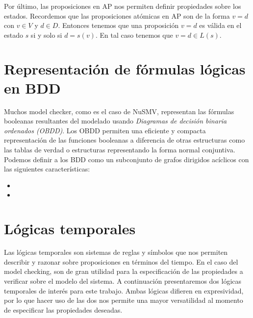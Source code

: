 \documentclass[titlepage, 12pt]{book}
\begin{document}
Por \'ultimo, las proposiciones en AP nos permiten definir propiedades sobre los estados. Recordemos que las proposiciones at\'omicas en AP son de la forma $v=d$ con $v \in V$ y $d \in D$. Entonces tenemos que una proposici\'on $v=d$ es v\'alida en el estado $s$ si y solo si $d = s(v)$. En tal caso tenemos que $v=d \in L(s)$.








\section{Representaci\'on de f\'ormulas l\'ogicas en BDD}

Muchos model checker, como es el caso de NuSMV, representan las fórmulas booleanas resultantes del modelado usando \textit{Diagramas de decisión binaria ordenados (OBDD)}. Los OBDD permiten una eficiente y compacta representación de las funciones booleanas a diferencia de otras estructuras como las tablas de verdad o estructuras representando la forma normal conjuntiva.
Podemos definir a los BDD como un subconjunto de grafos dirigidos acíclicos con las siguientes características:
\begin{itemize}
\item
\item
\end{itemize}








\section{L\'ogicas temporales}
Las l\'ogicas temporales son sistemas de reglas y s\'imbolos que nos permiten describir y razonar sobre proposiciones en t\'erminos del tiempo. En el caso del model checking, son de gran utilidad para la especificaci\'on de las propiedades a verificar sobre el modelo del sistema. A continuaci\'on presentaremos dos l\'ogicas temporales de inter\'es para este trabajo. Ambas l\'ogicas difieren en expresividad, por lo que hacer uso de las dos nos permite una mayor versatilidad al momento de especificar las propiedades deseadas.\\
\end{document}
